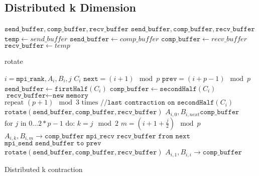 \subsection{Distributed k Dimension}


\begin{algorithm}
    \begin{algorithmic}
        \Require $\texttt{send\_buffer},\texttt{comp\_buffer},\texttt{recv\_buffer}$
        \Ensure $\texttt{send\_buffer},\texttt{comp\_buffer},\texttt{recv\_buffer}$
        \State $\texttt{temp} \gets {send\_buffer}$
        \State $\texttt{send\_buffer} \gets {comp\_buffer}$
        \State $\texttt{comp\_buffer} \gets {recv\_buffer}$
        \State $\texttt{recv\_buffer} \gets {temp}$
    \end{algorithmic}
    \caption{rotate}
    \label{rotate_pseudocode}
\end{algorithm}

\begin{algorithm}[h]

    \begin{algorithmic}
    \Require $i = \texttt{mpi\_rank}, A_i, B_i, j$
    \Ensure $C_i$
    \State $\texttt{next} = (i+1) \mod p$
    \State $\texttt{prev} = (i+p-1) \mod p$
    \State $\texttt{send\_buffer} \gets \texttt{firstHalf}(C_i)$
    \State $\texttt{comp\_buffer} \gets \texttt{secondHalf}(C_i)$
    \State $\texttt{recv\_buffer} \gets \texttt{new memory}$
    \State $\text{repeat } (p+1) \mod 3 \text{ times} \texttt{ //last contraction on secondHalf}(C_i)$ 
    \State \indent $\texttt{rotate}(\texttt{send\_buffer},\texttt{comp\_buffer},\texttt{recv\_buffer})$
    \State $A_{i,0}, B_{i,next} \texttt{comp\_buffer}$
    \State  $\text{for } j \text{ in } 0\dots 2 * p - 1 \text{ do:}$
    \State \indent $ k = j \mod 2 $
    \State \indent $ m = (i + 1 + \frac{j}{2}) \mod p$
    \State \indent {}
    \State \indent \indent $A_{i,k}, B_{i,m} \rightarrow \texttt{comp\_buffer}$
    \State \indent \indent $\texttt{mpi\_recv recv\_buffer from next}$
    \State \indent \indent $\texttt{mpi\_send send\_buffer to prev}$
    \State \indent $\texttt{rotate}(\texttt{send\_buffer},\texttt{comp\_buffer},\texttt{recv\_buffer})$
    \State $A_{i,1}, B_{i,i} \rightarrow \texttt{comp\_buffer}$

\end{algorithmic}
\caption{Distributed k contraction}
\label{k_pseudocode}
\end{algorithm}

